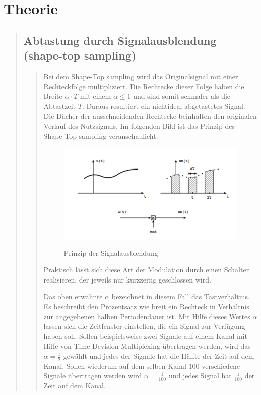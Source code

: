 \section{Theorie}
\begin{quote}
	\subsection{Abtastung durch Signalausblendung (shape-top sampling)}
    \begin{quote} 
        Bei dem Shape-Top sampling wird das Originalsignal mit einer Rechteckfolge multipliziert. Die Rechtecke dieser
        Folge haben die Breite $\alpha \cdot T$ mit einem $\alpha \leq 1$ und sind somit schmaler als die Abtastzeit
        $T$. Daraus resultiert ein nichtideal abgetastetes Signal. Die Dächer der ausschneidenden Rechtecke
        beinhalten den originalen Verlauf des Nutzsignals. Im folgenden Bild ist
        das Prinzip des Shape-Top sampling veranschaulicht.\\

        \begin{figure}[H]
        \centering
            \includegraphics[scale=0.6, trim = 0cm 0cm 0cm 0cm, clip]{./Bilder/PrinzipSignalausblendung}
                \caption{Prinzip der Signalausblendung}
                \cite{PrinzipSignalausblendung}
        \end{figure}
    
        Praktisch lässt sich diese Art der Modulation durch einen Schalter
        realisieren, der jeweils nur kurzzeitig geschlossen wird.\vspace{1em}
        
        Das oben erwähnte $\alpha$ bezeichnet in diesem Fall das
        Tastverhältnis. Es beschreibt den Prozentsatz wie breit ein Rechteck in Verhältnis zur angegebenen halben 
        Periodendauer ist. Mit Hilfe dieses Wertes $\alpha$ lassen sich die Zeitfenster einstellen, 
        die ein Signal zur Verfügung haben soll. Sollen beispielsweise zwei Signale auf einem Kanal mit Hilfe 
        von Time-Devision Multiplexing übertragen werden, wird das $\alpha =
        \frac{1}{2}$ gewählt und jedes der Signale hat die Hälfte der Zeit auf dem Kanal. Sollen wiederum auf dem selben 
        Kanal $100$ verschiedene Signale übertragen werden wird $\alpha = \frac{1}{100}$ und jedes Signal hat
        $\frac{1}{100}$ der Zeit auf dem Kanal.\vspace{1em}
        

\end{quote}
\end{quote}
